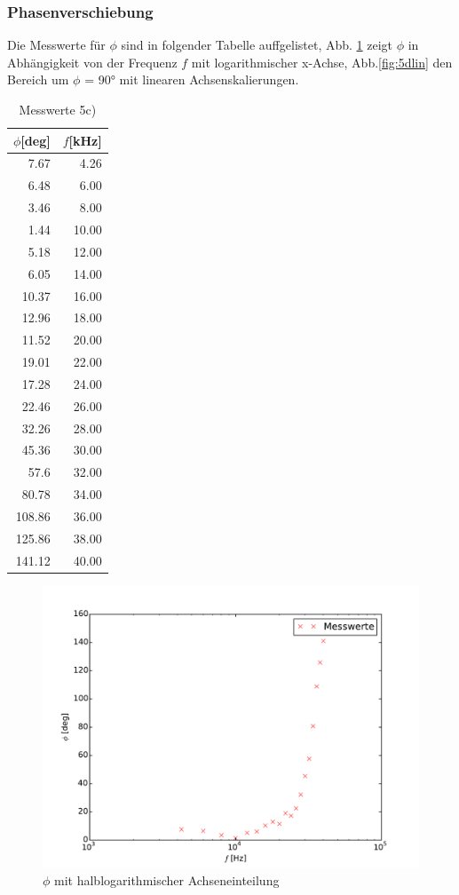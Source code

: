 \subsubsection{Phasenverschiebung}
Die Messwerte für $\phi$ sind in folgender Tabelle auffgelistet, Abb.
\ref{fig:5dlog} zeigt $\phi$ in Abhängigkeit von der Frequenz $f$ mit
logarithmischer x-Achse, Abb.\ref{fig:5dlin} den Bereich um $\phi$ = 90° mit
linearen Achsenskalierungen.
\begin{table}
\centering
\caption{Messwerte 5c)}
\label{tab:5c}
\begin{tabular}{rr}
\toprule
{$\phi$[deg]} &{$f$[kHz]}\\
\midrule
7.67 & 4.26 \\
6.48 & 6.00 \\
3.46 & 8.00 \\
1.44 & 10.00 \\
5.18 & 12.00 \\
6.05 & 14.00 \\
10.37 & 16.00 \\
12.96 & 18.00 \\
11.52 & 20.00 \\
19.01 & 22.00 \\
17.28 & 24.00 \\
22.46 & 26.00 \\
32.26 & 28.00 \\
45.36 & 30.00 \\
57.6 & 32.00 \\
80.78 & 34.00 \\
108.86 & 36.00 \\
125.86 & 38.00 \\
141.12 & 40.00 \\
\bottomrule
\end{tabular}
\end{table}

\begin{figure}
  \centering
  \includegraphics[width=\textwidth]{5d.pdf}
  \caption{$\phi$ mit halblogarithmischer Achseneinteilung}
  \label{fig:5dlog}
\end{figure}


